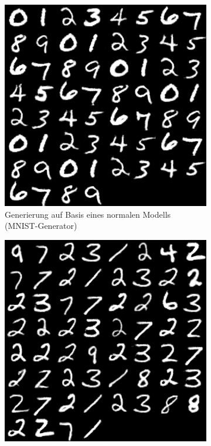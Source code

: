 \begin{figure}[H]
	\centering
	\begin{subfigure}[b]{0.35\linewidth}
		\includegraphics[width=\linewidth]{Bilder/mnist_kedmi.png}
		\caption{Generierung auf Basis eines normalen Modells (MNIST-Generator)}
		\label{img:kedmi_mnist}
	\end{subfigure}
	\hspace{1cm} %
	\begin{subfigure}[b]{0.35\linewidth}
		\includegraphics[width=\linewidth]{Bilder/mnist_kedmi_dp.png}

\end{subfigure}
\end{figure}
